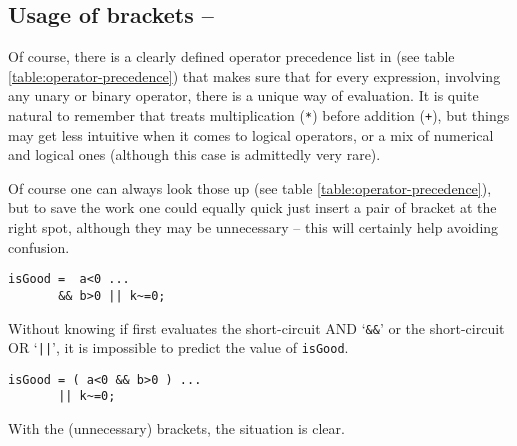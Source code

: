 \subsection{Usage of brackets -- \cleansymbol\cleansymbol}
Of course, there is a clearly defined operator precedence list in \matlab{} (see table \ref{table:operator-precedence}) that makes sure that for every \matlab{} expression, involving any unary or binary operator, there is a unique way of evaluation. It is quite natural to remember that \matlab{} treats multiplication (\lstinline!*!) before addition (\lstinline!+!), but things may get less intuitive when it comes to logical operators, or a mix of numerical and logical ones (although this case is admittedly very rare).

Of course one can always look those up (see table \ref{table:operator-precedence}), but to save the work one could equally quick just insert a pair of bracket at the right spot, although they may be unnecessary -- this will certainly help avoiding confusion.

\hfill
\begin{minipage}[t]{.45\textwidth}
\begin{lstlisting}[framerule=2pt,rulecolor=\color{badred}]
isGood =  a<0 ...
       && b>0 || k~=0;
\end{lstlisting}
Without knowing if \matlab{} first evaluates the short-circuit AND `\lstinline!&&!' or the short-circuit OR `\lstinline!||!', it is impossible to predict the value of \lstinline!isGood!.
\end{minipage}
\hfill
\begin{minipage}[t]{.45\textwidth}
\begin{lstlisting}[framerule=2pt,rulecolor=\color{goodgreen}]
isGood = ( a<0 && b>0 ) ...
       || k~=0;
\end{lstlisting}
With the (unnecessary) brackets, the situation is clear.
\end{minipage}
\hfill


